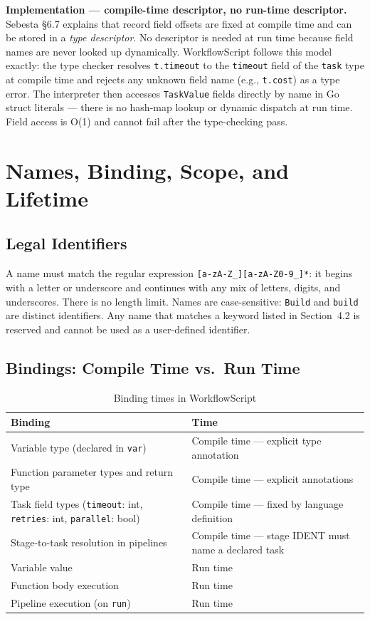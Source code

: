 \documentclass[10pt,a4paper]{article}
\begin{document}
\textbf{Implementation --- compile-time descriptor, no run-time descriptor.}
Sebesta \S6.7 explains that record field offsets are fixed at compile time and can be stored
in a \textit{type descriptor}. No descriptor is needed at run time because field names are
never looked up dynamically. WorkflowScript follows this model exactly: the type checker
resolves \texttt{t.timeout} to the \texttt{timeout} field of the \texttt{task} type at
compile time and rejects any unknown field name (e.g., \texttt{t.cost}) as a type error. The
interpreter then accesses \texttt{TaskValue} fields directly by name in Go struct literals ---
there is no hash-map lookup or dynamic dispatch at run time. Field access is O(1) and cannot
fail after the type-checking pass.

\section{Names, Binding, Scope, and Lifetime}

\subsection{Legal Identifiers}

A name must match the regular expression
\texttt{[a-zA-Z\_][a-zA-Z0-9\_]*}: it begins with a letter or
underscore and continues with any mix of letters, digits, and
underscores. There is no length limit. Names are case-sensitive:
\texttt{Build} and \texttt{build} are distinct identifiers. Any name
that matches a keyword listed in Section~4.2 is reserved and cannot be
used as a user-defined identifier.

\subsection{Bindings: Compile Time vs.\ Run Time}

\begin{table}[h!]
\centering
\begin{tabular}{@{}p{7.5cm}p{6.5cm}@{}}
\toprule
\textbf{Binding} & \textbf{Time} \\
\midrule
Variable type (declared in \texttt{var})
    & Compile time --- explicit type annotation \\
Function parameter types and return type
    & Compile time --- explicit annotations \\
Task field types (\texttt{timeout}: int, \texttt{retries}: int, \texttt{parallel}: bool)
    & Compile time --- fixed by language definition \\
Stage-to-task resolution in pipelines
    & Compile time --- stage IDENT must name a declared task \\
Variable value
    & Run time \\
Function body execution
    & Run time \\
Pipeline execution (on \texttt{run})
    & Run time \\
\bottomrule
\end{tabular}
\caption{Binding times in WorkflowScript}
\end{table}
\end{document}
